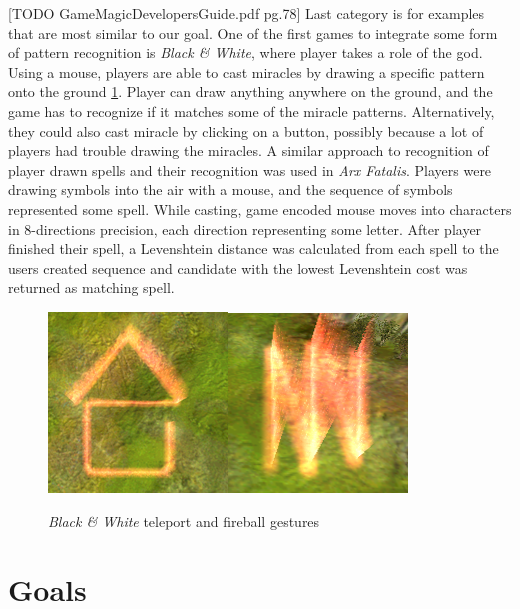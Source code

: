 [TODO GameMagicDevelopersGuide.pdf pg.78]
Last category is for examples that are most similar to our goal. One of the first games to integrate some form of pattern recognition is \emph{Black \& White}, where player takes a role of the god. Using a mouse, players are able to cast miracles by drawing a specific pattern onto the ground \ref{fig:blackwhite}. Player can draw anything anywhere on the ground, and the game has to recognize if it matches some of the miracle patterns. Alternatively, they could also cast miracle by clicking on a button, possibly because a lot of players had trouble drawing the miracles. A similar approach to recognition of player drawn spells and their recognition was used in \emph{Arx Fatalis}. Players were drawing symbols into the air with a mouse, and the sequence of symbols represented some spell. While casting, game encoded mouse moves into characters in 8-directions precision, each direction representing some letter. After player finished their spell, a Levenshtein distance was calculated from each spell to the users created sequence and candidate with the lowest Levenshtein cost was returned as matching spell.

\begin{figure}[!htb]
\begin{center}
\label{fig:blackwhite}
\includegraphics[width=.3\linewidth]{ext/gestureteleport.png}\quad\includegraphics[width=.3\linewidth]{ext/gesturefireball.png}
\end{center}
	\centering
	\caption{\emph{Black \& White} teleport and fireball gestures}
\end{figure}

\section{Goals}

